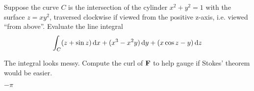 \begin{question}[M317 2007A] %
Suppose the curve $C$ is the intersection of the cylinder 
$x^2 + y^2 = 1$ with the surface $z = xy^2$, traversed clockwise if 
viewed from the positive z-axis, i.e. viewed ``from above''. 
Evaluate the line integral
\begin{equation*}
\int_C  (z + \sin z) \,\mathrm{d}x 
      + (x^3 - x^2 y) \,\mathrm{d}y 
      + (x \cos z - y) \,\mathrm{d}z
\end{equation*}
\end{question}

\begin{hint} 
The integral looks messy. Compute the curl of
$\mathbf{F}$ to help gauge if Stokes' theorem would be easier.
\end{hint}

\begin{answer} 
$-\pi$
\end{answer}


